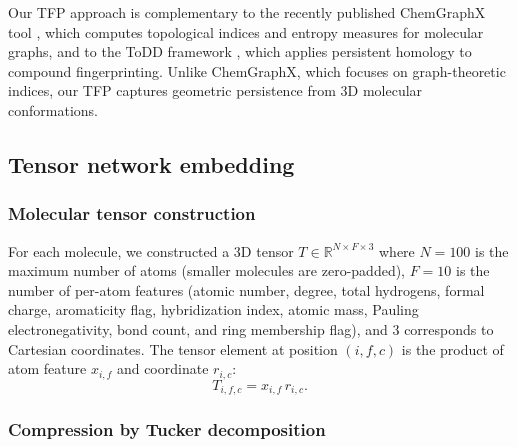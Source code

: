 \documentclass[11pt,a4paper]{article}
\begin{document}
Our TFP approach is complementary to the recently published ChemGraphX tool \citep{chemgraphx_2026}, which computes topological indices and entropy measures for molecular graphs, and to the ToDD framework \citep{todd_2023}, which applies persistent homology to compound fingerprinting. Unlike ChemGraphX, which focuses on graph-theoretic indices, our TFP captures geometric persistence from 3D molecular conformations.

\subsection{Tensor network embedding}

\subsubsection{Molecular tensor construction}

For each molecule, we constructed a 3D tensor $T \in \mathbb{R}^{N \times F \times 3}$ where $N = 100$ is the maximum number of atoms (smaller molecules are zero-padded), $F = 10$ is the number of per-atom features (atomic number, degree, total hydrogens, formal charge, aromaticity flag, hybridization index, atomic mass, Pauling electronegativity, bond count, and ring membership flag), and 3 corresponds to Cartesian coordinates. The tensor element at position $(i, f, c)$ is the product of atom feature $x_{i,f}$ and coordinate $r_{i,c}$:
\begin{equation}
T_{i,f,c} = x_{i,f} \, r_{i,c}.
\end{equation}

\subsubsection{Compression by Tucker decomposition}
\end{document}
